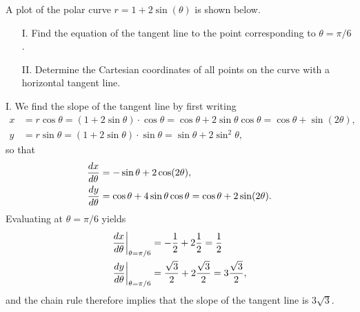 \documentclass[]{ximera}
\begin{document}
\begin{problem}
A plot of the polar curve $r=1+2\sin(\theta)$ is shown below.
\begin{image}  
\end{image} 

\begin{itemize}
\item[I.] Find the equation of the tangent line to the point corresponding to $\theta = \pi/6$.
\item[II.]  Determine the Cartesian coordinates of all points on the curve with a horizontal tangent line.
\end{itemize}
\begin{solution}
I. We find the slope of the tangent line by first writing
\begin{align*}
x &= r \cos \theta = (1+ 2 \sin \theta) \cdot \cos \theta = \cos \theta + 2 \sin\theta \cos \theta = \cos \theta + \sin (2\theta), \\
y&= r \sin \theta = (1+ 2 \sin \theta) \cdot \sin \theta = \sin \theta + 2 \sin^2 \theta,
\end{align*}
so that
\begin{align*}
\frac{\mathop{}\!d x}{\mathop{}\!d \theta} &= -\sin \theta + 2 \cos(2 \theta), \\
\frac{\mathop{}\!d y}{\mathop{}\!d \theta} &= \cos \theta + 4 \sin \theta \cos \theta = \cos \theta + 2 \sin(2 \theta).
\end{align*}
Evaluating at $\theta = \pi/6$ yields 
\begin{align*}
\left.\frac{\mathop{}\!d x}{\mathop{}\!d \theta}\right|_{\theta = \pi/6} &= -\frac{1}{2} +  2 \frac{1}{2} = \frac{1}{2} \\
\left.\frac{\mathop{}\!d y}{\mathop{}\!d \theta}\right|_{\theta = \pi/6} &= \frac{\sqrt{3}}{2} + 2 \frac{\sqrt{3}}{2} = 3 \frac{\sqrt{3}}{2},
\end{align*}
and the chain rule therefore implies that the slope of the tangent line is $3 \sqrt{3}$.


\end{solution}
\end{problem}
\end{document}
